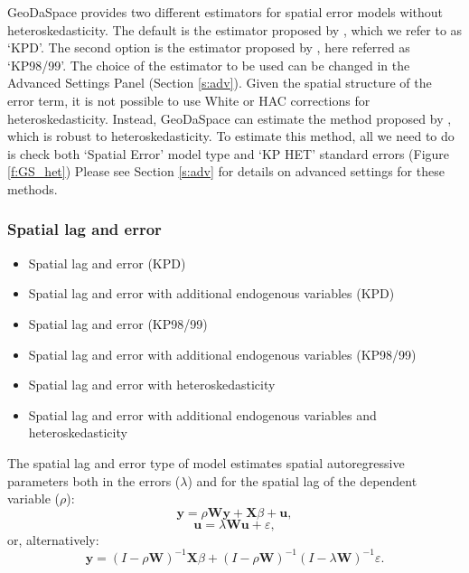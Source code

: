 \documentclass{article}
\begin{document}
GeoDaSpace provides two different estimators for spatial error models without heteroskedasticity. The default is the estimator proposed by \citet{Drukker10}, which we refer to as `KPD'. The second option is the estimator proposed by \citet{Kelejian98,Kelejian99}, here referred as `KP98/99'. The choice of the estimator to be used can be changed in the Advanced Settings Panel (Section \ref{s:adv}). Given the spatial structure of the error term, it is not possible to use White or HAC corrections for heteroskedasticity. Instead, GeoDaSpace can estimate the method proposed by \citet{Arraiz10}, which is robust to heteroskedasticity. To estimate this method, all we need to do is check both `Spatial Error' model type and `KP HET' standard errors (Figure \ref{f:GS_het}) Please see Section \ref{s:adv} for details on advanced settings for these methods.
\FloatBarrier

\subsubsection*{Spatial lag and error}
\begin{itemize}
\item Spatial lag and error (KPD)
\item Spatial lag and error with additional endogenous variables (KPD)
\item Spatial lag and error (KP98/99)
\item Spatial lag and error with additional endogenous variables (KP98/99)
\item Spatial lag and error with heteroskedasticity
\item Spatial lag and error with additional endogenous variables and heteroskedasticity
\end{itemize}

The spatial lag and error type of model estimates spatial autoregressive parameters both in the errors ($\lambda$) and for the spatial lag of the dependent variable ($\rho$):
\begin{equation}
\mathbf{y} = \rho \mathbf{W} \mathbf{y} + \mathbf{X}\beta + \mathbf{u},
\end{equation}
\begin{equation}
\mathbf{u} =  \lambda \mathbf{W} \mathbf{u} + \varepsilon,
\end{equation}
or, alternatively:
\begin{equation}
\mathbf{y} =  (I - \rho \mathbf{W})^{-1} \mathbf{X}\beta + (I - \rho \mathbf{W})^{-1}(I - \lambda \mathbf{W})^{-1} \varepsilon.
\end{equation}
\end{document}

